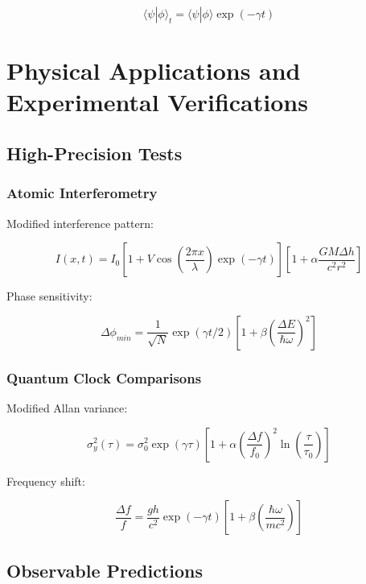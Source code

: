\documentclass[12pt]{article}
\theoremstyle{plain}
\theoremstyle{definition}
\theoremstyle{remark}
\begin{document}
\begin{equation}
\langle\psi|\phi\rangle_t = \langle\psi|\phi\rangle\exp(-\gamma t)
\end{equation}
\section{Physical Applications and Experimental Verifications}

\subsection{High-Precision Tests}

\subsubsection{Atomic Interferometry}

Modified interference pattern:

\begin{equation}
I(x,t) = I_0\left[1 + V\cos\left(\frac{2\pi x}{\lambda}\right)\exp(-\gamma t)\right]\left[1 + \alpha\frac{GM\Delta h}{c^2r^2}\right]
\end{equation}

Phase sensitivity:

\begin{equation}
\Delta\phi_{min} = \frac{1}{\sqrt{N}}\exp(\gamma t/2)\left[1 + \beta\left(\frac{\Delta E}{\hbar\omega}\right)^2\right]
\end{equation}

\subsubsection{Quantum Clock Comparisons}

Modified Allan variance:

\begin{equation}
\sigma_y^2(\tau) = \sigma_0^2\exp(\gamma \tau)\left[1 + \alpha\left(\frac{\Delta f}{f_0}\right)^2\ln\left(\frac{\tau}{\tau_0}\right)\right]
\end{equation}

Frequency shift:

\begin{equation}
\frac{\Delta f}{f} = \frac{gh}{c^2}\exp(-\gamma t)\left[1 + \beta\left(\frac{\hbar\omega}{mc^2}\right)\right]
\end{equation}

\subsection{Observable Predictions}
\end{document}
